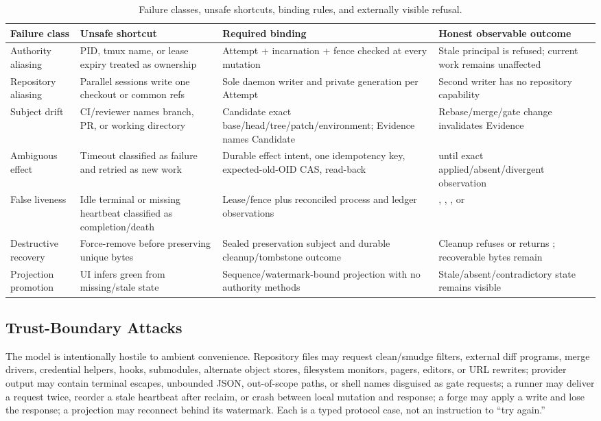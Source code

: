 \documentclass[journal]{IEEEtran}
\newcommand{\code}[1]{\texttt{\detokenize{#1}}}
\begin{document}
\begin{table}[!t]
\caption{Failure classes, unsafe shortcuts, binding rules, and externally visible refusal.}
\label{tab:failurebindings}
\centering
\scriptsize
\begin{tabularx}{\textwidth}{@{}p{}p{}p{}X@{}}
\toprule
Failure class & Unsafe shortcut & Required binding & Honest observable outcome \\
\midrule
Authority aliasing & PID, tmux name, or lease expiry treated as ownership & Attempt + incarnation + fence checked at every mutation & Stale principal is refused; current work remains unaffected \\
Repository aliasing & Parallel sessions write one checkout or common refs & Sole daemon writer and private generation per Attempt & Second writer has no repository capability \\
Subject drift & CI/reviewer names branch, PR, or working directory & Candidate exact base/head/tree/patch/environment; Evidence names Candidate & Rebase/merge/gate change invalidates Evidence \\
Ambiguous effect & Timeout classified as failure and retried as new work & Durable effect intent, one idempotency key, expected-old-OID CAS, read-back & \code{UNKNOWN} until exact applied/absent/divergent observation \\
False liveness & Idle terminal or missing heartbeat classified as completion/death & Lease/fence plus reconciled process and ledger observations & \code{ALIVE}, \code{DEAD}, \code{UNKNOWN}, or \code{CONTRADICTORY} \\
Destructive recovery & Force-remove before preserving unique bytes & Sealed preservation subject and durable cleanup/tombstone outcome & Cleanup refuses or returns \code{UNKNOWN}; recoverable bytes remain \\
Projection promotion & UI infers green from missing/stale state & Sequence/watermark-bound projection with no authority methods & Stale/absent/contradictory state remains visible \\
\bottomrule
\end{tabularx}
\end{table}

\subsection{Trust-Boundary Attacks}

The model is intentionally hostile to ambient convenience. Repository files
may request clean/smudge filters, external diff programs, merge drivers,
credential helpers, hooks, submodules, alternate object stores, filesystem
monitors, pagers, editors, or URL rewrites; provider output may contain
terminal escapes, unbounded JSON, out-of-scope paths, or shell names disguised
as gate requests; a runner may deliver a request twice, reorder a stale
heartbeat after reclaim, or crash between local mutation and response; a forge
may apply a write and lose the response; a projection may reconnect behind its
watermark. Each is a typed protocol case, not an instruction to ``try again.''
\end{document}
